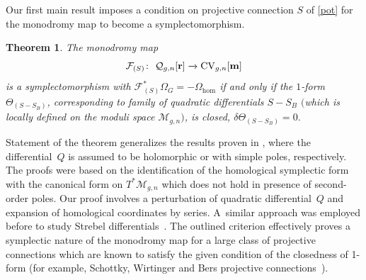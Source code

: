 \documentclass[pdftex]{sigma}
\numberwithin{equation}{section}
\newtheorem{Theorem}{Theorem}[section]
\theoremstyle{definition}
\begin{document}
Our first main result imposes a condition on projective connection $S$ of \eqref{pot} for the monodromy map to become a symplectomorphism.

\begin{Theorem} \label{Th_1}
The monodromy map
\begin{equation*}%
\mathcal{F}_{(S)}\colon \ \mathcal{Q}_{g,n}[\mathbf{r}] \xrightarrow[]{} {\rm CV}_{g,n}[\mathbf{m}]
\end{equation*} is a symplectomorphism with $\mathcal{F}_{(S)}^*\Omega_G=-\Omega_{\hom}$
if and only if the $1$-form $\Theta_{(S-S_B)}$, corresponding to family of quadratic differentials $S-S_B$ $($which is locally
defined on the moduli space $\mathcal{M}_{g,n})$,
is closed, $\delta\Theta_{(S-S_B)}=0.$
\end{Theorem}

Statement of the theorem generalizes the results proven in \cite{Bertola_2017, korotkin2018periods}, where the differential~$Q$ is assumed to be holomorphic or with simple poles, respectively. The proofs were based on the identification of the homological symplectic form with the canonical form on $T^*\mathcal{M}_{g,n}$ which does not hold in presence of second-order poles. Our proof involves a perturbation of quadratic differential~$Q$ and expansion of homological coordinates by series. A~similar approach was employed before to study Strebel differentials~\cite{DuaHub}. The outlined criterion effectively proves a symplectic nature of the monodromy map for a large class of projective connections which are known to satisfy the given condition of the closedness of 1-form (for example, Schottky, Wirtinger and Bers projective connections~\cite{Bertola_2017}).
\end{document}
